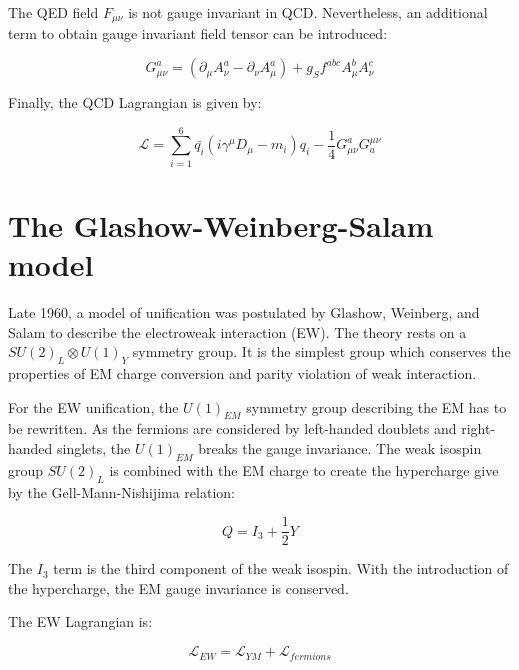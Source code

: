     The QED field $F_{\mu \nu}$ is not gauge invariant in QCD.
    Nevertheless, an additional term to obtain gauge invariant field tensor can be introduced:
    
    \begin{equation}
      G^a_{\mu \nu} = \left( \partial_{\mu} A^a_{\nu} - \partial_{\nu} A^a_{\mu} \right) + g_S f^{abc} A^b_{\mu} A^c_{\nu}
    \end{equation} 

    Finally, the QCD Lagrangian is given by:

    \begin{equation}
      \mathcal{L} = \sum_{i=1}^6  \bar{q_i} \left(i \gamma^{\mu}D_{\mu} -m_i \right)q_i - \frac{1}{4} G_{\mu \nu}^{a} G_{a}^{\mu \nu}
    \end{equation}
    

    \section{The Glashow-Weinberg-Salam model}

    Late 1960, a model of unification was postulated by Glashow, Weinberg, and Salam to describe the electroweak interaction (EW).
    The theory rests on a  $SU(2)_L \otimes U(1)_Y$ symmetry group.
    It is the simplest group which conserves the properties of EM charge conversion and parity violation of weak interaction.

    For the EW unification, the $U(1)_{EM}$ symmetry group describing the EM has to be rewritten.
    As the fermions are considered by left-handed doublets and right-handed singlets, the $U(1)_{EM}$ breaks the gauge invariance.
    The weak isospin group $SU(2)_L$ is combined with the EM charge to create the hypercharge give by the Gell-Mann-Nishijima relation: 
  
    \begin{equation}
      Q = I_3 + \frac{1}{2}Y
    \end{equation}
   
    The $I_3$ term is the third component of the weak isospin.
    With the introduction of the hypercharge, the EM gauge invariance is conserved.

    The EW Lagrangian is:

    \begin{equation}
      \mathcal{L}_{EW} = \mathcal{L}_{YM} + \mathcal{L}_{fermions}
      \label{eq:ewLag}
    \end{equation}


